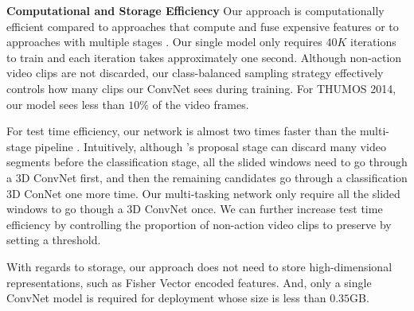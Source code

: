 \documentclass[10pt,twocolumn,letterpaper]{article}
\begin{document}
\noindent \textbf{Computational and Storage Efficiency}
Our approach is computationally efficient compared to approaches that compute and fuse expensive features \cite{learThumos2014} or to approaches with multiple stages \cite{scnn_shou_wang_chang_cvpr16,fast_temporal_action_proposal_fabian_cvpr16,frame_glimpse_yeung_cvpr16}. Our single model only requires $40K$ iterations to train and each iteration takes approximately one second. Although non-action video clips are not discarded, our class-balanced sampling strategy effectively controls how many clips our ConvNet sees during training. For THUMOS 2014, our model sees less than $10\%$ of the video frames. 

For test time efficiency, our network is almost two times faster than the multi-stage pipeline \cite{scnn_shou_wang_chang_cvpr16}. Intuitively, although \cite{scnn_shou_wang_chang_cvpr16}'s proposal stage can discard many video segments before the classification stage, all the slided windows need to go through a 3D ConvNet first, and then the remaining candidates go through a classification 3D ConNet one more time. Our multi-tasking network only require all the slided windows to go though a 3D ConvNet once. 
We can further increase test time efficiency by controlling the proportion of non-action video clips to preserve by setting a threshold. 

With regards to storage, our approach does not need to store high-dimensional representations, such as Fisher Vector encoded features. And, only a single ConvNet model is required for deployment whose size is less than $0.35$GB. 
\end{document}
